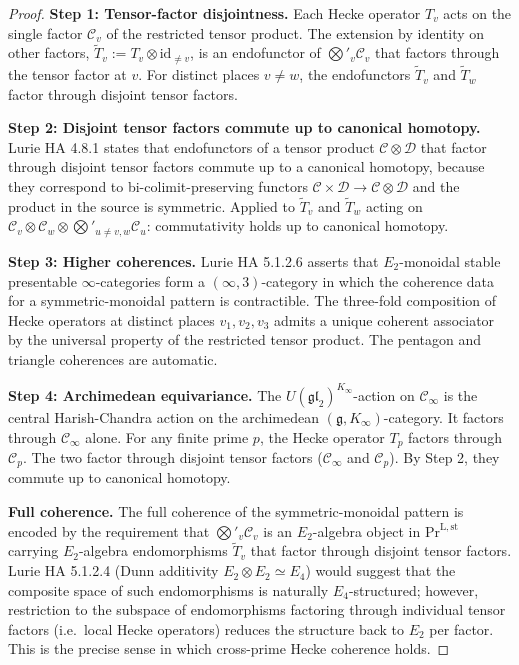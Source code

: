 \begin{proof}
\textbf{Step 1: Tensor-factor disjointness.} Each Hecke operator
\(T_{v}\) acts on the single factor \(\mathcal{C}_{v}\) of the restricted
tensor product. The extension by identity on other factors,
\(\widetilde{T}_{v} := T_{v} \otimes \mathrm{id}_{\neq v}\), is an
endofunctor of \(\bigotimes'_{v}\mathcal{C}_{v}\) that factors
through the tensor factor at \(v\). For distinct places \(v \neq w\), the
endofunctors \(\widetilde{T}_{v}\) and \(\widetilde{T}_{w}\) factor
through disjoint tensor factors.

\textbf{Step 2: Disjoint tensor factors commute up to canonical
homotopy.} Lurie HA 4.8.1 states that endofunctors of a tensor
product \(\mathcal{C} \otimes \mathcal{D}\) that factor through
disjoint tensor factors commute up to a canonical homotopy, because
they correspond to bi-colimit-preserving functors
\(\mathcal{C} \times \mathcal{D} \to \mathcal{C} \otimes \mathcal{D}\)
and the product in the source is symmetric. Applied to
\(\widetilde{T}_{v}\) and \(\widetilde{T}_{w}\) acting on
\(\mathcal{C}_{v} \otimes \mathcal{C}_{w} \otimes
\bigotimes'_{u \neq v, w}\mathcal{C}_{u}\): commutativity holds up to
canonical homotopy.

\textbf{Step 3: Higher coherences.} Lurie HA 5.1.2.6 asserts that
\(E_{2}\)-monoidal stable presentable \(\infty\)-categories form a
\((\infty, 3)\)-category in which the coherence data for a
symmetric-monoidal pattern is contractible. The three-fold
composition of Hecke operators at distinct places \(v_{1}, v_{2}, v_{3}\)
admits a unique coherent associator by the universal property of the
restricted tensor product. The pentagon and triangle coherences are
automatic.

\textbf{Step 4: Archimedean equivariance.} The
\(U(\mathfrak{gl}_{2})^{K_{\infty}}\)-action on \(\mathcal{C}_{\infty}\)
is the central Harish-Chandra action on the archimedean
\((\mathfrak{g},K_{\infty})\)-category. It factors through
\(\mathcal{C}_{\infty}\) alone. For any finite prime \(p\), the Hecke
operator \(T_{p}\) factors through \(\mathcal{C}_{p}\). The two factor
through disjoint tensor factors (\(\mathcal{C}_{\infty}\) and
\(\mathcal{C}_{p}\)). By Step 2, they commute up to canonical
homotopy.

\textbf{Full coherence.} The full coherence of the
symmetric-monoidal pattern is encoded by the requirement that
\(\bigotimes'_{v}\mathcal{C}_{v}\) is an \(E_{2}\)-algebra object in
\(\mathrm{Pr}^{\mathrm{L,st}}\) carrying \(E_{2}\)-algebra endomorphisms
\(\widetilde{T}_{v}\) that factor through disjoint tensor factors. Lurie
HA 5.1.2.4 (Dunn additivity \(E_{2} \otimes E_{2} \simeq E_{4}\)) would
suggest that the composite space of such endomorphisms is naturally
\(E_{4}\)-structured; however, restriction to the subspace of
endomorphisms factoring through individual tensor factors (i.e.\
local Hecke operators) reduces the structure back to \(E_{2}\) per
factor. This is the precise sense in which cross-prime Hecke
coherence holds.
\end{proof}

